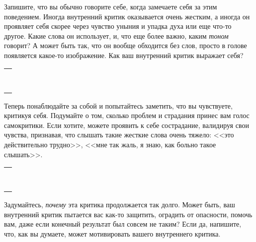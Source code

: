 \begin{itemize}
	\itemWritingHand Запишите, что вы обычно говорите себе, когда замечаете себя за этим поведением. Иногда внутренний критик оказывается очень жестким, а иногда он проявляет себя скорее через чувство уныния и упадка духа или еще что-то другое. Какие слова он использует, и, что еще более важно, каким \emph{тоном} говорит? А может быть так, что он вообще обходится без слов, просто в голове появляется какое-то изображение. Как ваш внутренний критик выражает себя? 
\end{itemize}
\setlength{\extrarowheight}{2mm}
\begin{tabularx}{\textwidth}{X}
	\\
	\arrayrulecolor{gray}\hline\\
	\hline\\
	\hline\\
	\hline\\
	\hline\\
	\hline\\	
	\hline\\
	\hline\\
	\hline\\
\end{tabularx}
\setlength{\extrarowheight}{0mm}
\begin{itemize}
	\itemWritingHand Теперь понаблюдайте за собой и попытайтесь заметить, что вы чувствуете, критикуя себя. Подумайте о том, сколько проблем и страдания принес вам голос самокритики. Если хотите, можете проявить к себе сострадание, валидируя свои чувства, признавая, что слышать такие жесткие слова очень тяжело: <<это действительно трудно>>, <<мне так жаль, я знаю, как больно такое слышать>>.
\end{itemize}
\setlength{\extrarowheight}{2mm}
\begin{tabularx}{\textwidth}{X}
	\\
	\arrayrulecolor{gray}\hline\\
	\hline\\
	\hline\\
	\hline\\
	\hline\\
	\hline\\	
	\hline\\
	\hline\\
	\hline\\
\end{tabularx}
\setlength{\extrarowheight}{0mm}
\begin{itemize}
	\itemWritingHand Задумайтесь, \emph{почему} эта критика продолжается так долго. Может быть, ваш внутренний критик пытается вас как-то защитить, оградить от опасности, помочь вам, даже если конечный результат был совсем не таким? Если да, напишите, что, как вы думаете, может мотивировать вашего внутреннего критика.
\end{itemize}
